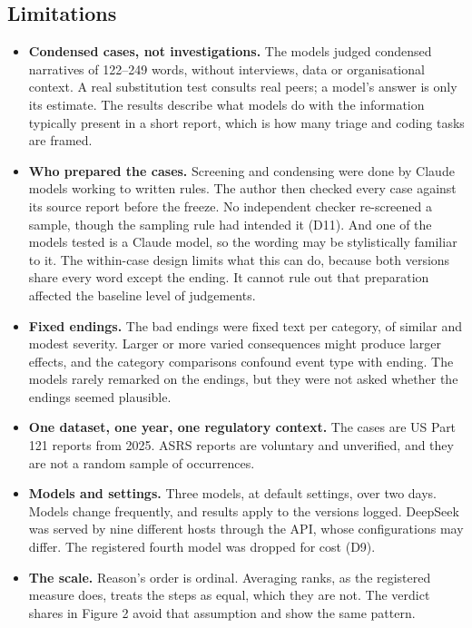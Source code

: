 \documentclass[11pt]{article}
\providecommand{\tightlist}{\setlength{\itemsep}{0pt}\setlength{\parskip}{0pt}}
\begin{document}
\hypertarget{limitations}{%
\subsection{Limitations}\label{limitations}}

\begin{itemize}
\tightlist
\item
  \textbf{Condensed cases, not investigations.} The models judged condensed narratives of 122--249 words, without interviews, data or organisational context. A real substitution test consults real peers; a model's answer is only its estimate. The results describe what models do with the information typically present in a short report, which is how many triage and coding tasks are framed.
\item
  \textbf{Who prepared the cases.} Screening and condensing were done by Claude models working to written rules. The author then checked every case against its source report before the freeze. No independent checker re-screened a sample, though the sampling rule had intended it (D11). And one of the models tested is a Claude model, so the wording may be stylistically familiar to it. The within-case design limits what this can do, because both versions share every word except the ending. It cannot rule out that preparation affected the baseline level of judgements.
\item
  \textbf{Fixed endings.} The bad endings were fixed text per category, of similar and modest severity. Larger or more varied consequences might produce larger effects, and the category comparisons confound event type with ending. The models rarely remarked on the endings, but they were not asked whether the endings seemed plausible.
\item
  \textbf{One dataset, one year, one regulatory context.} The cases are US Part 121 reports from 2025. ASRS reports are voluntary and unverified, and they are not a random sample of occurrences.
\item
  \textbf{Models and settings.} Three models, at default settings, over two days. Models change frequently, and results apply to the versions logged. DeepSeek was served by nine different hosts through the API, whose configurations may differ. The registered fourth model was dropped for cost (D9).
\item
  \textbf{The scale.} Reason's order is ordinal. Averaging ranks, as the registered measure does, treats the steps as equal, which they are not. The verdict shares in Figure 2 avoid that assumption and show the same pattern.

\end{itemize}
\end{document}
